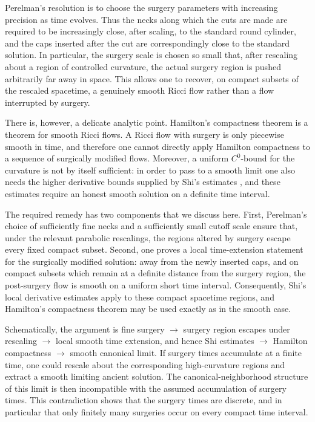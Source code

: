 \documentclass{amsart}
\begin{document}
\noindent Perelman's resolution is to choose the surgery parameters with increasing
precision as time evolves.  Thus the necks along which the cuts are made are
required to be increasingly close, after scaling, to the standard round cylinder,
and the caps inserted after the cut are correspondingly close to the standard
solution.  In particular, the surgery scale is chosen so small that, after
rescaling about a region of controlled curvature, the actual surgery region is
pushed arbitrarily far away in space.  This allows one to recover, on compact
subsets of the rescaled spacetime, a genuinely smooth Ricci flow rather than a
flow interrupted by surgery.

\noindent There is, however, a delicate analytic point.  Hamilton's compactness theorem is
a theorem for smooth Ricci flows.  A Ricci flow with surgery is only piecewise
smooth in time, and therefore one cannot directly apply Hamilton compactness to
a sequence of surgically modified flows.  Moreover, a uniform \(C^{0}\)-bound for
the curvature is not by itself sufficient: in order to pass to a smooth limit one
also needs the higher derivative bounds supplied by Shi's estimates \cite{shi89}, and these
estimates require an honest smooth solution on a definite time interval.

\noindent The required remedy has two components that we discuss here.  First, Perelman's choice of sufficiently
fine necks and a sufficiently small cutoff scale ensure that, under the relevant
parabolic rescalings, the regions altered by surgery escape every fixed compact
subset.  Second, one proves a local time-extension statement for the surgically
modified solution: away from the newly inserted caps, and on compact subsets
which remain at a definite distance from the surgery region, the post-surgery flow
is smooth on a uniform short time interval.  Consequently, Shi's local derivative
estimates \cite{shi89}
apply to these compact spacetime regions, and Hamilton's compactness
theorem may be used exactly as in the smooth case.

\noindent Schematically, the argument is
fine surgery
$\rightarrow$
surgery region escapes under rescaling
$\rightarrow$
local smooth time extension, 
and hence
Shi estimates
$\rightarrow$
Hamilton compactness
$\rightarrow$
smooth canonical limit. If surgery times accumulate at a finite time, one could rescale about the
corresponding high-curvature regions and extract a smooth limiting ancient
solution.  The canonical-neighborhood structure of this limit is then
incompatible with the assumed accumulation of surgery times.  This contradiction
shows that the surgery times are discrete, and in particular that only finitely
many surgeries occur on every compact time interval.
\end{document}
